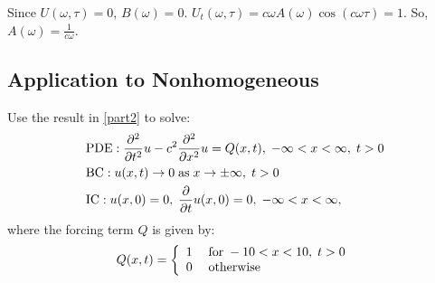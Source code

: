 \documentclass[12pt]{article}
\begin{document}
Since $U(\omega,\tau) = 0$, $B(\omega) = 0$. $U_t(\omega,\tau) = c\omega A(\omega)\cos(c\omega\tau) = 1$. So, $A(\omega) = \frac{1}{c\omega}$.

\subsection{Application to Nonhomogeneous}

Use the result in \ref{part2} to solve:
\begin{align*}
&\mathrm{PDE}: \frac{\partial^2}{\partial t^2}u -c^2\frac{\partial^2}{\partial x^2}u = Q(x,t), \; -\infty < x < \infty, \; t > 0 \\
&\mathrm{BC}: u(x,t) \rightarrow 0 \; \mathrm{as} \; x \rightarrow \pm\infty, \; t > 0 \\
&\mathrm{IC}: u(x,0) = 0, \;\frac{\partial}{\partial t}u(x,0) = 0, \; -\infty < x < \infty,
\end{align*}
where the forcing term $Q$ is given by:
\[
Q(x,t) = \left \{ \begin{array}{ll}
 1 & \; \mathrm{for} \; -10<x<10,\; t>0 \\
 0 & \; \mathrm{otherwise} \;
\end{array} \right . \]
\end{document}
